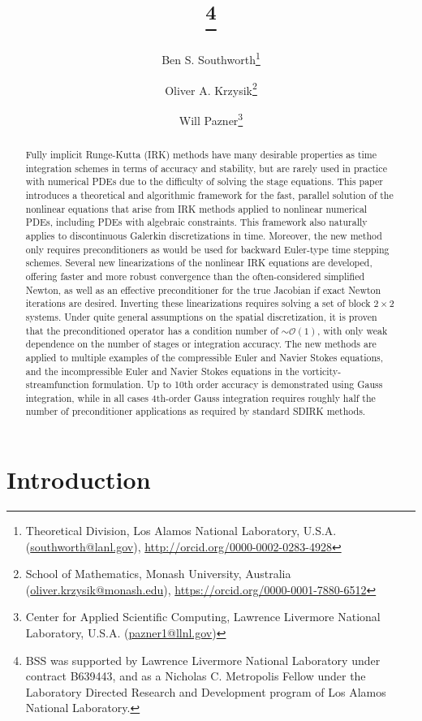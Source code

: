 \documentclass[review]{siamart}
\title{{\TheTitle}\thanks{BSS was supported by Lawrence Livermore National
      Laboratory under contract B639443, and as a Nicholas C. Metropolis Fellow
      under the Laboratory Directed Research and Development program of Los
      Alamos National Laboratory.
  }}
\author{Ben S. Southworth\thanks{Theoretical Division, Los Alamos National Laboratory,
    U.S.A. (\url{southworth@lanl.gov}),
    \url{http://orcid.org/0000-0002-0283-4928}}
    \and
    Oliver A. Krzysik\thanks{School of Mathematics, Monash University,
  	Australia (\url{oliver.krzysik@monash.edu}),
  	\url{https://orcid.org/0000-0001-7880-6512}}
  	\and
  	Will Pazner\thanks{Center for Applied Scientific Computing,
  	Lawrence Livermore National Laboratory,
    U.S.A. (\url{pazner1@llnl.gov})}
}
\begin{document}
\maketitle
\allowdisplaybreaks

\begin{abstract}
Fully implicit Runge-Kutta (IRK) methods have many desirable properties as time
integration schemes in terms of accuracy and stability, but are rarely used in
practice with numerical PDEs due to the difficulty of solving the stage equations.
This paper introduces a theoretical and algorithmic framework for the fast,
parallel solution of the nonlinear equations that arise from
IRK methods applied to nonlinear numerical PDEs, including PDEs with algebraic
constraints. This framework also naturally applies to discontinuous
Galerkin discretizations in time. Moreover, the new method only requires
preconditioners as would be used for backward Euler-type time stepping schemes.
Several new linearizations of the nonlinear IRK equations are developed,
offering faster and more robust convergence than the often-considered simplified
Newton, as well as an effective preconditioner for the true Jacobian if exact
Newton iterations are desired. Inverting these linearizations requires solving a
set of block $2\times 2$ systems. Under quite general assumptions on the
spatial discretization, it is proven that the preconditioned operator has a
condition number of $\sim\mathcal{O}(1)$, with only weak dependence on the
number of stages or integration accuracy. The new
methods are applied to multiple examples of the compressible Euler and Navier
Stokes equations, and the incompressible Euler and Navier Stokes equations
in the vorticity-streamfunction formulation. Up to 10th order accuracy is
demonstrated using Gauss integration, while in all cases 4th-order Gauss integration
requires roughly half the number of preconditioner applications as required
by standard SDIRK methods.
\end{abstract}


\section{Introduction}\label{sec:intro}

\end{document}
